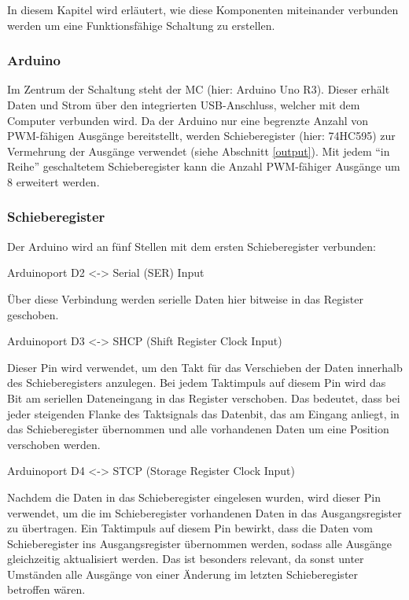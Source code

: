 In diesem Kapitel wird erläutert, wie diese Komponenten miteinander verbunden werden um eine Funktionsfähige
Schaltung zu erstellen.

\subsubsection{Arduino}

Im Zentrum der Schaltung steht der \ac{MC} (hier: Arduino Uno R3).
Dieser erhält Daten und Strom über den integrierten USB-Anschluss, welcher mit dem Computer verbunden wird.
Da der Arduino nur eine begrenzte Anzahl von \ac{PWM}-fähigen Ausgänge bereitstellt, werden Schieberegister (hier: 74HC595) zur Vermehrung der Ausgänge verwendet (siehe Abschnitt \ref{output}).
Mit jedem \enquote{in Reihe} geschaltetem Schieberegister kann die Anzahl \ac{PWM}-fähiger Ausgänge um 8 erweitert werden.

\subsubsection{Schieberegister}

Der Arduino wird an fünf Stellen mit dem ersten Schieberegister verbunden:

Arduinoport D2 <-> Serial (SER) Input

Über diese Verbindung werden serielle Daten hier bitweise in das Register geschoben.

Arduinoport D3 <-> SHCP (Shift Register Clock Input)

Dieser Pin wird verwendet, um den Takt für das Verschieben der Daten innerhalb des Schieberegisters anzulegen.
Bei jedem Taktimpuls auf diesem Pin wird das Bit am seriellen Dateneingang in das Register verschoben.
Das bedeutet, dass bei jeder steigenden Flanke des Taktsignals das Datenbit, das am Eingang anliegt, in das Schieberegister übernommen und alle vorhandenen Daten um eine Position verschoben werden.

Arduinoport D4 <-> STCP (Storage Register Clock Input)

Nachdem die Daten in das Schieberegister eingelesen wurden, wird dieser Pin verwendet, um die im Schieberegister vorhandenen Daten in das Ausgangsregister zu übertragen.
Ein Taktimpuls auf diesem Pin bewirkt, dass die Daten vom Schieberegister ins Ausgangsregister übernommen werden, sodass alle Ausgänge gleichzeitig aktualisiert werden.
Das ist besonders relevant, da sonst unter Umständen alle Ausgänge von einer Änderung im letzten Schieberegister betroffen wären.

